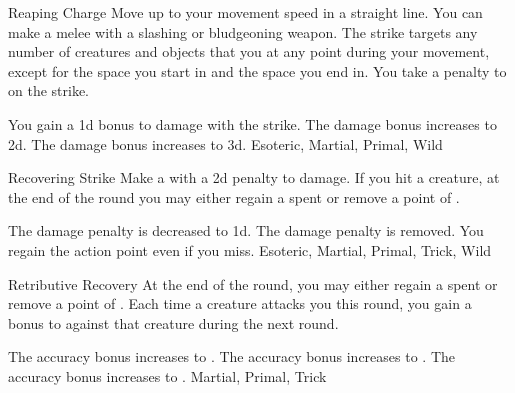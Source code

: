 \lowercase{\hypertarget{maneuver:Reaping Charge}{}}\label{maneuver:Reaping Charge}
\hypertarget{maneuver:Reaping Charge}{}
\begin{apability}{Reaping Charge}
Move up to your movement speed in a straight line.
You can make a melee  with a slashing or bludgeoning weapon.
The strike targets any number of creatures and objects that you  at any point during your movement, except for the space you start in and the space you end in.
You take a  penalty to  on the strike.

\rankline
{} You gain a \plus1d bonus to damage with the strike.
 The damage bonus increases to \plus2d.
 The damage bonus increases to \plus3d.
 Esoteric, Martial, Primal, Wild
\end{apability}
\vspace{0.25em}



\lowercase{\hypertarget{maneuver:Recovering Strike}{}}\label{maneuver:Recovering Strike}
\hypertarget{maneuver:Recovering Strike}{}
\begin{freeability}{Recovering Strike}
Make a  with a \minus2d penalty to damage.
If you hit a creature, at the end of the round you may either regain a spent  or remove a point of .

\rankline
{} The damage penalty is decreased to \minus1d.
 The damage penalty is removed.
 You regain the action point even if you miss.
 Esoteric, Martial, Primal, Trick, Wild
\end{freeability}
\vspace{0.25em}



\lowercase{\hypertarget{maneuver:Retributive Recovery}{}}\label{maneuver:Retributive Recovery}
\hypertarget{maneuver:Retributive Recovery}{}
\begin{freeability}{Retributive Recovery}
At the end of the round, you may either regain a spent  or remove a point of .
Each time a creature attacks you this round, you gain
a  bonus to  against that creature during the next round.

\rankline
{} The accuracy bonus increases to .
 The accuracy bonus increases to .
 The accuracy bonus increases to .
 Martial, Primal, Trick
\end{freeability}
\vspace{0.25em}



